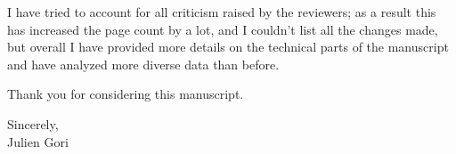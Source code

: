 \documentclass{article}
\begin{document}
I have tried to account for all criticism raised by the reviewers; as a result this has increased the page count by a lot, and I couldn't list all the changes made, but overall I have provided more details on the technical parts of the manuscript and have analyzed more diverse data than before.


Thank you for considering this manuscript. \\
\begin{flushright}
Sincerely,\\
Julien Gori
\end{flushright}
\end{document}
